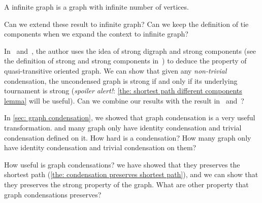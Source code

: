 \begin{definition}
  A infinite graph is a graph with infinite number of vertices.
\end{definition}

Can we extend these result to infinite graph?
Can we keep the definition of tie components when
we expand the context to infinite graph?

In~\cite{bang-jensen_kings_1998}
and~\cite{bangjensen_quasitransitive_1995},
the author uses the idea of strong digraph and strong components
(see the definition of strong and strong components
in~\cite{west_introduction_2001})
to deduce the property of quasi-transitive oriented graph.
We can show that given any \emph{non-trivial} condensation,
the uncondensed graph is strong
if and only if its underlying tournament is strong
(\emph{spoiler alert!}:
\cref{the: shortest path different components lemma} will be useful).
Can we combine our results with the result
in~\cite{bang-jensen_kings_1998} and~\cite{bangjensen_quasitransitive_1995}?

In \cref{sec: graph condensation},
we showed that graph condensation is a very useful transformation.
and many graph only have identity condensation
and trivial condensation defined on it.
How hard is a condensation?
How many graph only have identity condensation
and trivial condensation on them?

How useful is graph condensations?
we have showed that they preserves the shortest path
(\cref{the: condensation preserves shortest path}),
and we can show that they preserves the strong property of the graph.
What are other property that graph condensations preserves?
